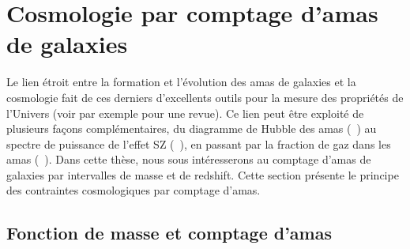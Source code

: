 \section{Cosmologie par comptage d'amas de galaxies} \label{sec:cluster_nbcount}

Le lien étroit entre la formation et l'évolution des amas de galaxies et la cosmologie fait de ces derniers d'excellents outils pour la mesure des propriétés de l'Univers (voir par exemple \cite{allen_cosmological_2011} pour une revue).
Ce lien peut être exploité de plusieurs façons complémentaires, du diagramme de Hubble des amas (\eg\ \cite{kozmanyan_deriving_2019}) au spectre de puissance de l'effet SZ (\eg\ \cite{ruppin_impact_2019-1}), en passant par la fraction de gaz dans les amas (\eg\ \cite{mantz_cosmology_2014}).
Dans cette thèse, nous sous intéresserons au comptage d'amas de galaxies par intervalles de masse et de redshift.
Cette section présente le principe des contraintes cosmologiques par comptage d'amas.

\subsection{Fonction de masse et comptage d'amas}


